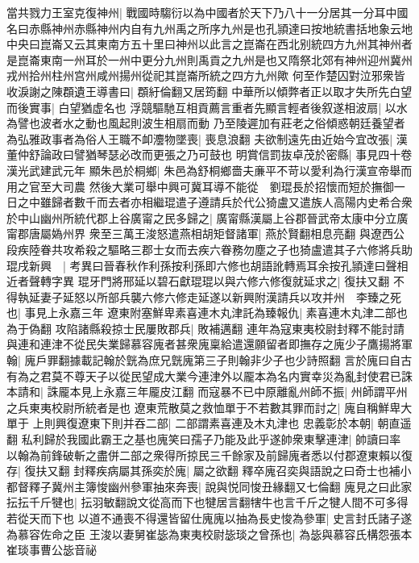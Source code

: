 當共戮力王室克復神州|{
	戰國時騶衍以為中國者於天下乃八十一分居其一分耳中國名曰赤縣神州赤縣神州内自有九州禹之所序九州是也孔頴達曰按地統書括地象云地中央曰崑崙又云其東南方五十里曰神州以此言之崑崙在西北别統四方九州其神州者是崑崙東南一州耳於一州中更分九州則禹貢之九州是也又隋祭北郊有神州迎州冀州戎州拾州柱州宫州咸州揚州從祀其崑崙所統之四方九州歟}
何至作楚囚對泣邪衆皆收淚謝之陳頵遺王導書曰|{
	頵紆倫翻又居筠翻}
中華所以傾弊者正以取才失所先白望而後實事|{
	白望猶虚名也}
浮競驅馳互相貢薦言重者先顯言輕者後叙遂相波扇|{
	以水為譬也波者水之動也風起則波生相扇而動}
乃至陵遲加有莊老之俗傾惑朝廷養望者為弘雅政事者為俗人王職不卹灋物墜喪|{
	喪息浪翻}
夫欲制遠先由近始今宜改張|{
	漢董仲舒論政曰譬猶琴瑟必改而更張之乃可鼓也}
明賞信罰抜卓茂於密縣|{
	事見四十卷漢光武建武元年}
顯朱邑於桐鄉|{
	朱邑為舒桐鄉嗇夫亷平不苛以愛利為行漢宣帝舉而用之官至大司農}
然後大業可舉中興可冀耳導不能從　劉琨長於招懷而短於撫御一日之中雖歸者數千而去者亦相繼琨遣子遵請兵於代公猗盧又遣族人高陽内史希合衆於中山幽州所統代郡上谷廣甯之民多歸之|{
	廣甯縣漢屬上谷郡晉武帝太康中分立廣甯郡唐屬媯州界}
衆至三萬王浚怒遣燕相胡矩督諸軍|{
	燕於賢翻相息亮翻}
與遼西公段疾陸眷共攻希殺之驅略三郡士女而去疾六眷務勿塵之子也猗盧遣其子六修將兵助琨戌新興　|{
	考異曰晉春秋作利孫按利孫即六修也胡語訛轉焉耳余按孔頴達曰聲相近者聲轉字異}
琨牙門將邢延以碧石獻琨琨以與六修六修復就延求之|{
	復扶又翻}
不得執延妻子延怒以所部兵襲六修六修走延遂以新興附漢請兵以攻并州　李臻之死也|{
	事見上永嘉三年}
遼東附塞鮮卑素喜連木丸津託為臻報仇|{
	素喜連木丸津二部也為于偽翻}
攻陷諸縣殺掠士民屢敗郡兵|{
	敗補邁翻}
連年為寇東夷校尉封釋不能討請與連和連津不從民失業歸慕容廆者甚衆廆稟給遣還願留者即撫存之廆少子鷹揚將軍翰|{
	廆戶罪翻據載記翰於皝為庶兄皝廆第三子則翰非少子也少詩照翻}
言於廆曰自古有為之君莫不尊天子以從民望成大業今連津外以龎本為名内實幸災為亂封使君已誅本請和|{
	誅龎本見上永嘉三年龎皮江翻}
而寇暴不已中原離亂州師不振|{
	州師謂平州之兵東夷校尉所統者是也}
遼東荒散莫之救恤單于不若數其罪而討之|{
	廆自稱鮮卑大單于}
上則興復遼東下則并吞二部|{
	二部謂素喜連及木丸津也}
忠義彰於本朝|{
	朝直遥翻}
私利歸於我國此霸王之基也廆笑曰孺子乃能及此乎遂帥衆東擊連津|{
	帥讀曰率}
以翰為前鋒破斬之盡併二部之衆得所掠民三千餘家及前歸廆者悉以付郡遼東賴以復存|{
	復扶又翻}
封釋疾病屬其孫奕於廆|{
	屬之欲翻}
釋卒廆召奕與語說之曰奇士也補小都督釋子冀州主簿悛幽州參軍抽來奔喪|{
	說與悦同悛丑緣翻又七倫翻}
廆見之曰此家抎抎千斤犍也|{
	抎羽敏翻說文從高而下也犍居言翻犗牛也言千斤之犍人間不可多得若從天而下也}
以道不通喪不得還皆留仕廆廆以抽為長史悛為參軍|{
	史言封氏諸子遂為慕容佐命之臣}
王浚以妻舅崔毖為東夷校尉毖琰之曾孫也|{
	為毖與慕容氏構怨張本崔琰事曹公毖音祕}


